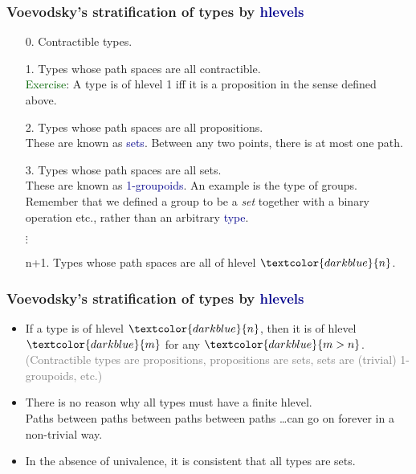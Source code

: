 \documentclass[aspectratio=169]{beamer}
\newcommand{\db}{\textcolor{darkblue}}
\newcommand{\dg}{\textcolor{darkgreen}}
\newcommand{\grey}{\textcolor{grey}}
\newcommand{\m}[1]{$\db{#1}$}
\begin{document}
 \begin{frame}
   \frametitle{Voevodsky's stratification of types by \db{hlevels}}

   \begin{enumerate}
   \vfill \item[0.] Contractible types.
   \vfill \item[1.] Types whose path spaces are all contractible. \\[1ex]

   \dg{Exercise}: A type is of hlevel 1 iff it is a proposition in the sense defined above.

     \vfill \item[2.] Types whose path spaces are all propositions. \\[1ex]

     These are known as \db{sets}. Between any two points, there is at most one path.

     \vfill \item[3.] Types whose path spaces are all sets. \\[1ex]

     These are known as \db{1-groupoids}. An example is the type of groups. \\[1ex]

     Remember that we defined a group to be a \emph{set} together with a binary operation etc., rather than an arbitrary \db{type}.

$\vdots$

       \vfill \item[n+1.] Types whose path spaces are all of hlevel \m{n}.


   \end{enumerate}



 \end{frame}

 \begin{frame}
   \frametitle{Voevodsky's stratification of types by \db{hlevels}}

   \begin{itemize}
   \vfill \item If a type is of hlevel \m{n}, then it is of hlevel \m{m} for any \m{m>n}. \\[1ex]

     \grey{(Contractible types are propositions, propositions are sets, sets are (trivial) 1-groupoids, etc.)}


     \vfill \item There is no reason why all types must have a finite hlevel. \\[1ex] Paths between paths between paths between paths \dots can go on forever in a non-trivial way.

   \vfill \item In the absence of univalence, it is consistent that all types are sets.
   \end{itemize}

 \end{frame}
\end{document}
